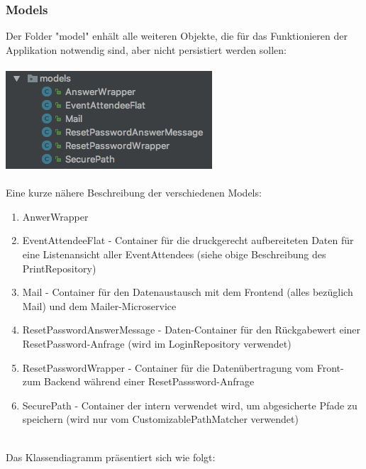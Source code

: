 \documentclass[11pt]{article} %
\begin{document}
\subsubsection{Models}
Der Folder "model" enhält alle weiteren Objekte, die für das Funktionieren der Applikation notwendig sind, aber nicht persistiert werden sollen:
\\
\\
\includegraphics[scale=0.7]{structure_eventmanagement_models}
\\
\\
Eine kurze nähere Beschreibung der verschiedenen Models:
\begin{enumerate}
\item AnwerWrapper
\item EventAttendeeFlat - Container für die druckgerecht aufbereiteten Daten für eine Listenansicht aller EventAttendees (siehe obige Beschreibung des PrintRepository)
\item Mail - Container für den Datenaustausch mit dem Frontend (alles bezüglich Mail) und dem Mailer-Microservice
\item ResetPasswordAnswerMessage - Daten-Container für den Rückgabewert einer ResetPassword-Anfrage (wird im LoginRepository verwendet)
\item ResetPasswordWrapper - Container für die Datenübertragung vom Front- zum Backend während einer ResetPasssword-Anfrage
\item SecurePath - Container der intern verwendet wird, um abgesicherte Pfade zu speichern (wird nur vom CustomizablePathMatcher verwendet)
\end{enumerate} \leavevmode
\\
Das Klassendiagramm präsentiert sich wie folgt:
\\
\\
\end{document}
